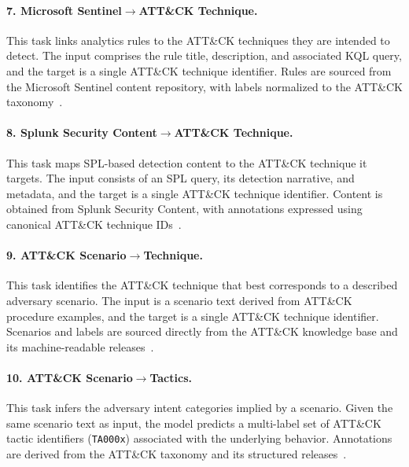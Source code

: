 \paragraph{7. Microsoft Sentinel$\rightarrow$ATT\&CK Technique.}
This task links analytics rules to the ATT\&CK techniques they are intended to detect. The input comprises the rule title, description, and associated KQL query, and the target is a single ATT\&CK technique identifier. Rules are sourced from the Microsoft Sentinel content repository, with labels normalized to the ATT\&CK taxonomy~\citep{azure_sentinel,mitre_attack}.

\paragraph{8. Splunk Security Content$\rightarrow$ATT\&CK Technique.}
This task maps SPL-based detection content to the ATT\&CK technique it targets. The input consists of an SPL query, its detection narrative, and metadata, and the target is a single ATT\&CK technique identifier. Content is obtained from Splunk Security Content, with annotations expressed using canonical ATT\&CK technique IDs~\citep{splunk_security_content,mitre_attack}.








\paragraph{9. ATT\&CK Scenario$\rightarrow$Technique.}
This task identifies the ATT\&CK technique that best corresponds to a described adversary scenario. The input is a scenario text derived from ATT\&CK procedure examples, and the target is a single ATT\&CK technique identifier. Scenarios and labels are sourced directly from the ATT\&CK knowledge base and its machine-readable releases~\citep{mitre_attack,attack_stix_data}.

\paragraph{10. ATT\&CK Scenario$\rightarrow$Tactics.}
This task infers the adversary intent categories implied by a scenario. Given the same scenario text as input, the model predicts a multi-label set of ATT\&CK tactic identifiers (\texttt{TA000x}) associated with the underlying behavior. Annotations are derived from the ATT\&CK taxonomy and its structured releases~\citep{mitre_attack,attack_stix_data}.

